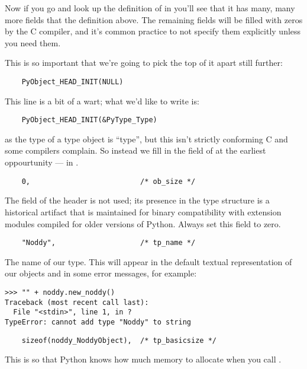 Now if you go and look up the definition of  in
 you'll see that it has many, many more fields that the
definition above.  The remaining fields will be filled with zeros by
the C compiler, and it's common practice to not specify them
explicitly unless you need them.  

This is so important that we're going to pick the top of it apart still
further:

\begin{verbatim}
    PyObject_HEAD_INIT(NULL)
\end{verbatim}

This line is a bit of a wart; what we'd like to write is:

\begin{verbatim}
    PyObject_HEAD_INIT(&PyType_Type)
\end{verbatim}

as the type of a type object is ``type'', but this isn't strictly
conforming C and some compilers complain.  So instead we fill in the
 field of  at the earliest
oppourtunity --- in .

\begin{verbatim}
    0,                          /* ob_size */
\end{verbatim}

The  field of the header is not used; its presence in
the type structure is a historical artifact that is maintained for
binary compatibility with extension modules compiled for older
versions of Python.  Always set this field to zero.

\begin{verbatim}
    "Noddy",                    /* tp_name */
\end{verbatim}

The name of our type.  This will appear in the default textual
representation of our objects and in some error messages, for example:

\begin{verbatim}
>>> "" + noddy.new_noddy()
Traceback (most recent call last):
  File "<stdin>", line 1, in ?
TypeError: cannot add type "Noddy" to string
\end{verbatim}

\begin{verbatim}
    sizeof(noddy_NoddyObject),  /* tp_basicsize */
\end{verbatim}

This is so that Python knows how much memory to allocate when you call
.

